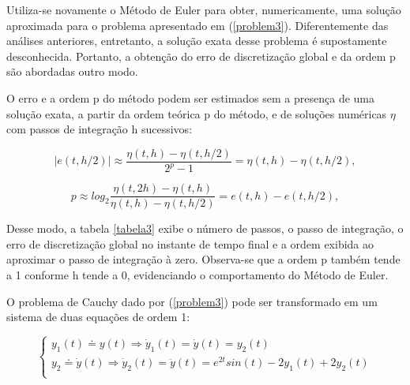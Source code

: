 \documentclass[12pt]{article}
\begin{document}
       \hspace{0.7cm}Utiliza-se novamente o Método de Euler para obter, numericamente, uma solução aproximada para o problema apresentado em (\ref{problem3}). Diferentemente das análises anteriores, entretanto, a solução exata desse problema é supostamente desconhecida. Portanto, a obtenção do erro de discretização global e da ordem p são abordadas outro modo.
       
       \hspace{0.2cm}O erro e a ordem p do método podem ser estimados sem a presença de uma solução exata, a partir da ordem teórica p do método, e de soluções numéricas \(\eta \) com passos de integração h sucessivos:
       
       \begin{equation}
        |e(t,h/2)| \approx \frac{\eta(t,h) - \eta(t,h/2)}{2^p - 1} = \eta(t,h) - \eta(t,h/2),  
       \end{equation}
       
       \begin{equation}
        p \approx log_2\frac{\eta(t,2h) - \eta(t,h)}{\eta(t,h) - \eta(t,h/2)} = e(t,h) - e(t,h/2),  
       \end{equation}

        \hspace{0.2cm}Desse modo, a tabela \ref{tabela3} exibe o número de passos, o passo de integração, o erro de discretização global no instante de tempo final e a ordem exibida ao aproximar o passo de integração à zero. Observa-se que a ordem p também tende a 1 conforme h tende a 0, evidenciando o comportamento do Método de Euler.

        \hspace{0.2cm}O problema de Cauchy dado por (\ref{problem3}) pode ser transformado em um sistema de duas equações de ordem 1: 

         \begin{equation}
            \begin{cases}
               y_1(t) \doteq y(t) \Rightarrow \dot y_1(t) = \dot y(t) = y_2(t) \\
               y_2 \doteq \dot y(t) \Rightarrow \dot y_2(t) = \ddot y(t) = 
                   e^{2t}sin(t) - 2y_1(t) + 2y_2(t)   \\
            \end{cases}
         \end{equation}
        
\end{document}
